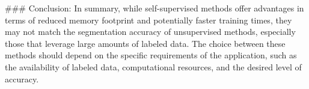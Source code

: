 ### Conclusion:
In summary, while self-supervised methods offer advantages in terms of reduced memory footprint and potentially faster training times, they may not match the segmentation accuracy of unsupervised methods, especially those that leverage large amounts of labeled data. The choice between these methods should depend on the specific requirements of the application, such as the availability of labeled data, computational resources, and the desired level of accuracy.